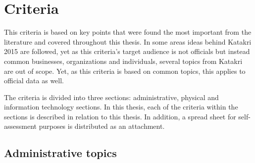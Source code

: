 \documentclass{article}
\begin{document}
\section{Criteria}
This criteria is based on key points that were found the most important from the literature and covered throughout this thesis. In some areas ideas behind Katakri 2015 are followed, yet as this criteria's target audience is not officials but instead common businesses, organizations and individuals, several topics from Katakri are out of scope. Yet, as this criteria is based on common topics, this applies to official data as well.
\par
The criteria is divided into three sections: administrative, physical and information technology sections. In this thesis, each of the criteria within the sections is described in relation to this thesis. In addition, a spread sheet for self-assessment purposes is distributed as an attachment.
\subsection{Administrative topics}
\end{document}

